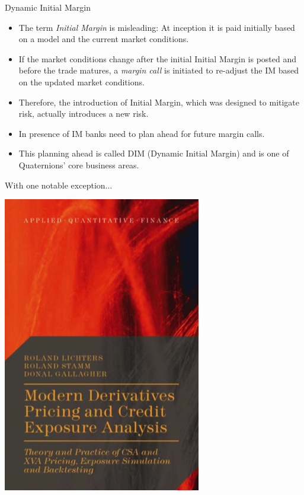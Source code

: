 \documentclass[t]{beamer}
\begin{document}
\begin{frame}{Dynamic Initial Margin}
	\begin{itemize}
		\item
			The term \emph{Initial Margin} is misleading: At inception it is paid initially based on a model and the current market conditions.
		\item
			If the market conditions change after the initial Initial Margin is posted and before the trade matures, a \emph{margin call} is initiated to re-adjust the IM based on the updated market conditions.
		\item
			Therefore, the introduction of Initial Margin, which was designed to mitigate risk, actually introduces a new risk. 
		\item
			In presence of IM banks need to plan ahead for future margin calls. 
		\item
			This planning ahead is called DIM (Dynamic Initial Margin) and is one of Quaternions' core business areas.
	\end{itemize}
\end{frame}

\begin{frame}{With one notable exception...}
	\begin{center}
		\includegraphics[scale=0.5]{pics/book.png}
	\end{center}
\end{frame}
\end{document}
